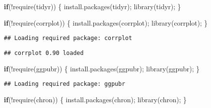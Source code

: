 \documentclass[
]{article}
\newenvironment{Shaded}{\begin{snugshade}}{\end{snugshade}}
\newcommand{\ControlFlowTok}[1]{\textcolor[rgb]{0.13,0.29,0.53}{\textbf{#1}}}
\newcommand{\FunctionTok}[1]{\textcolor[rgb]{0.00,0.00,0.00}{#1}}
\newcommand{\NormalTok}[1]{#1}
\newcommand{\SpecialCharTok}[1]{\textcolor[rgb]{0.00,0.00,0.00}{#1}}
\newcommand{\StringTok}[1]{\textcolor[rgb]{0.31,0.60,0.02}{#1}}
\begin{document}
\begin{Shaded}
\begin{Highlighting}[]
\ControlFlowTok{if}\NormalTok{(}\SpecialCharTok{!}\FunctionTok{require}\NormalTok{(}\StringTok{\textquotesingle{}tidyr\textquotesingle{}}\NormalTok{))}
\NormalTok{\{}
  \FunctionTok{install.packages}\NormalTok{(}\StringTok{\textquotesingle{}tidyr\textquotesingle{}}\NormalTok{);}
  \FunctionTok{library}\NormalTok{(tidyr);}
\NormalTok{\}  }
\end{Highlighting}
\end{Shaded}

\begin{Shaded}
\begin{Highlighting}[]
\ControlFlowTok{if}\NormalTok{(}\SpecialCharTok{!}\FunctionTok{require}\NormalTok{(}\StringTok{\textquotesingle{}corrplot\textquotesingle{}}\NormalTok{))}
\NormalTok{\{}
  \FunctionTok{install.packages}\NormalTok{(}\StringTok{\textquotesingle{}corrplot\textquotesingle{}}\NormalTok{);}
  \FunctionTok{library}\NormalTok{(corrplot);}
\NormalTok{\} }
\end{Highlighting}
\end{Shaded}

\begin{verbatim}
## Loading required package: corrplot
\end{verbatim}

\begin{verbatim}
## corrplot 0.90 loaded
\end{verbatim}

\begin{Shaded}
\begin{Highlighting}[]
\ControlFlowTok{if}\NormalTok{(}\SpecialCharTok{!}\FunctionTok{require}\NormalTok{(}\StringTok{\textquotesingle{}ggpubr\textquotesingle{}}\NormalTok{))}
\NormalTok{\{}
\FunctionTok{install.packages}\NormalTok{(}\StringTok{\textquotesingle{}ggpubr\textquotesingle{}}\NormalTok{);}
  \FunctionTok{library}\NormalTok{(ggpubr);}
\NormalTok{\}}
\end{Highlighting}
\end{Shaded}

\begin{verbatim}
## Loading required package: ggpubr
\end{verbatim}

\begin{Shaded}
\begin{Highlighting}[]
  \ControlFlowTok{if}\NormalTok{(}\SpecialCharTok{!}\FunctionTok{require}\NormalTok{(}\StringTok{\textquotesingle{}chron\textquotesingle{}}\NormalTok{))}
\NormalTok{\{}
  \FunctionTok{install.packages}\NormalTok{(}\StringTok{\textquotesingle{}chron\textquotesingle{}}\NormalTok{);}
  \FunctionTok{library}\NormalTok{(chron);}
\NormalTok{\}}
\end{Highlighting}
\end{Shaded}
\end{document}
